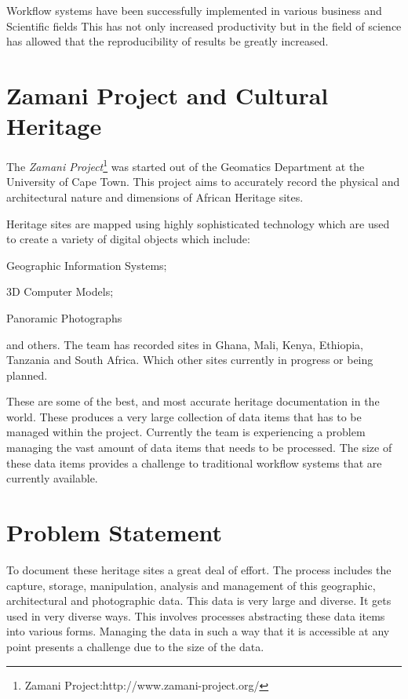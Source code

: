\documentclass[12pt,a4paper]{report}
\begin{document}
    Workflow systems have been successfully implemented in various
    business and Scientific fields \cite{Brahe:2007:SWW:1316624.1316661}
    This has not only increased productivity but in the field of
    science has allowed that the reproducibility of results be greatly
    increased\cite{4721191}.




\section{Zamani Project and Cultural Heritage}
    The \emph{Zamani Project}\footnote{Zamani Project:http://www.zamani-project.org/}
    was started out of the Geomatics Department at the University of Cape Town.
    This project aims to accurately record the physical and architectural nature
    and dimensions of African Heritage sites.

    Heritage sites are mapped using highly sophisticated technology which are
    used to create a variety of digital objects which include:
    \begin{inparaenum}[i)] \item Geographic Information Systems; \item 3D
    Computer Models; \item Panoramic Photographs\end{inparaenum} and others.
    The team has recorded sites in Ghana, Mali, Kenya, Ethiopia, Tanzania and
    South Africa. Which other sites currently in progress or being planned.

    These are some of the best, and most accurate heritage documentation
    in the world.
    These produces a very large collection of data items that has to be managed
    within the project. Currently the team is experiencing a problem managing
    the vast amount of data items that needs to be processed. The size of these
    data items provides a challenge to traditional workflow systems that are
    currently available.


\section{Problem Statement}
    To document these heritage sites a great deal of effort. The process includes
    the capture, storage, manipulation, analysis and management of this geographic,
    architectural and photographic data. This data is very large and diverse. It gets
    used in very diverse ways. This involves processes abstracting these data
    items into various forms. Managing the data in such a way that it is accessible
    at any point presents a challenge due to the size of the data.
\end{document}
